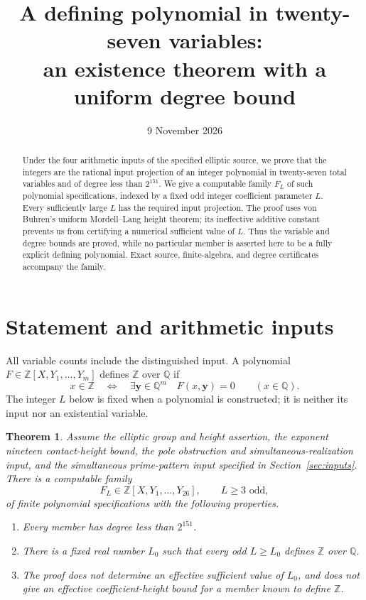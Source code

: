 \documentclass[11pt,a4paper]{article}
\title{A defining polynomial in twenty-seven variables:\\
an existence theorem with a uniform degree bound}
\author{}\date{9 November 2026}
\newtheorem{theorem}{Theorem}\newtheorem{lemma}[theorem]{Lemma}
\newcommand{\Q}{\mathbb Q}\newcommand{\Z}{\mathbb Z}
\begin{document}
\maketitle
\begin{abstract}
Under the four arithmetic inputs of the specified elliptic source,
we prove that the integers are the rational input projection of an
integer polynomial in twenty-seven total variables and of degree
less than $2^{151}$. We give a computable family $F_L$ of such
polynomial specifications, indexed by a fixed odd integer coefficient
parameter $L$. Every sufficiently large $L$ has the required input
projection. The proof uses von Buhren's uniform Mordell--Lang
height theorem; its ineffective additive constant prevents us from
certifying a numerical sufficient value of $L$. Thus the variable
and degree bounds are proved, while no particular member is asserted
here to be a fully explicit defining polynomial. Exact source,
finite-algebra, and degree certificates accompany the family.
\end{abstract}

\section{Statement and arithmetic inputs}

All variable counts include the distinguished input. A polynomial
$F\in\Z[X,Y_1,\ldots,Y_m]$ defines $\Z$ over $\Q$ if
\[
 x\in\Z\quad\Longleftrightarrow\quad
 \exists\mathbf y\in\Q^m\quad F(x,\mathbf y)=0
 \qquad(x\in\Q).
\]
The integer $L$ below is fixed when a polynomial is constructed;
it is neither its input nor an existential variable.

\begin{theorem}\label{thm:main}
Assume the elliptic group and height assertion, the exponent
nineteen contact-height bound, the pole obstruction and
simultaneous-realization input, and the simultaneous prime-pattern input
specified in Section~\ref{sec:inputs}. There is a computable
family
\[
 F_L\in\Z[X,Y_1,\ldots,Y_{26}],\qquad
 L\ge3\text{ odd},
\]
of finite polynomial specifications with the following properties.
\begin{enumerate}
\item Every member has degree less than $2^{151}$.
\item There is a fixed real number $L_0$ such that every odd
      $L\ge L_0$ defines $\Z$ over $\Q$.
\item The proof does not determine an effective sufficient
      value of $L_0$, and does not give an effective
      coefficient-height bound for a member known to define $\Z$.
\end{enumerate}
\end{theorem}
\end{document}
